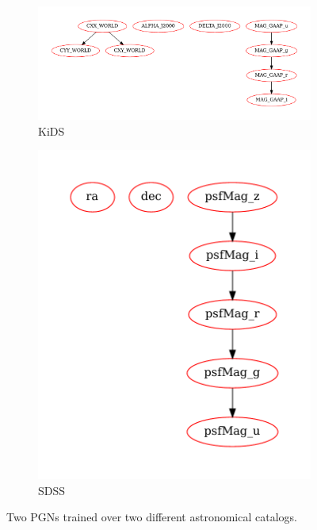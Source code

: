 \begin{figure}[htpb]
    \centering
    \begin{subfigure}[]{\textwidth}
    \includegraphics[width=\textwidth]{images/A2_prototypes/png_kids.pdf}
    \caption{\gls{KiDS}}
    \end{subfigure}
    \begin{subfigure}[]{0.5\textwidth}
    \includegraphics[width=\textwidth]{images/A2_prototypes/png_sdss.pdf}
    \caption{\gls{SDSS}}
    \end{subfigure}
    \caption{Two \glspl{PGN} trained over two different astronomical catalogs.}
    \label{fig:bayes1}
\end{figure}

